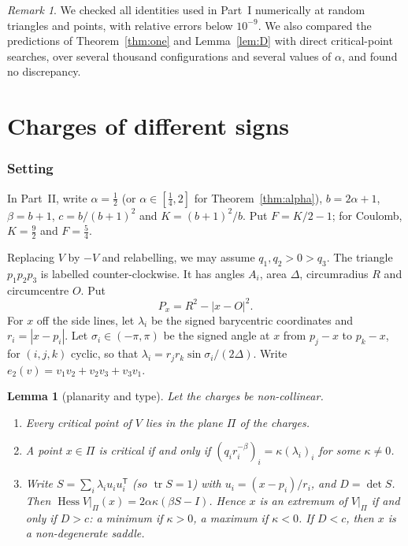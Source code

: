 \documentclass[11pt]{amsart}
\newtheorem{lemma}[theorem]{Lemma}
\theoremstyle{remark}
\newtheorem{remark}[theorem]{Remark}
\DeclareMathOperator{\Hess}{Hess}
\begin{document}
\begin{remark}
We checked all identities used in Part~I numerically at random triangles and points, with relative errors below
$10^{-9}$. We also compared the predictions of Theorem~\ref{thm:one} and Lemma~\ref{lem:D} with direct critical-point
searches, over several thousand configurations and several values of $\alpha$, and found no discrepancy.
\end{remark}

\part{Charges of different signs}

\section{Setting}\label{sec:setting}

In Part~II, write $\alpha=\tfrac12$ (or $\alpha\in[\tfrac14,2]$ for Theorem~\ref{thm:alpha}), $b=2\alpha+1$, $\beta=b+1$,
$c=b/(b+1)^2$ and $K=(b+1)^2/b$. Put $F=K/2-1$; for Coulomb, $K=\tfrac92$ and $F=\tfrac54$.

Replacing $V$ by $-V$ and relabelling, we may assume $q_1,q_2>0>q_3$. The triangle $p_1p_2p_3$ is labelled
counter-clockwise. It has angles $A_i$, area $\Delta$, circumradius $R$ and circumcentre $O$. Put
\[
  P_x=R^2-|x-O|^2 .
\]
For $x$ off the side lines, let $\lambda_i$ be the signed barycentric coordinates and $r_i=|x-p_i|$. Let
$\sigma_i\in(-\pi,\pi)$ be the signed angle at $x$ from $p_j-x$ to $p_k-x$, for $(i,j,k)$ cyclic, so that
$\lambda_i=r_jr_k\sin\sigma_i/(2\Delta)$. Write $e_2(v)=v_1v_2+v_2v_3+v_3v_1$.

\begin{lemma}[planarity and type]\label{lem:type}
Let the charges be non-collinear.
\begin{enumerate}
\item Every critical point of $V$ lies in the plane $\Pi$ of the charges.
\item A point $x\in\Pi$ is critical if and only if $(q_ir_i^{-\beta})_i=\kappa(\lambda_i)_i$ for some $\kappa\ne0$.
\item Write $S=\sum_i\lambda_iu_iu_i^{\mathsf T}$ (so $\operatorname{tr}S=1$) with $u_i=(x-p_i)/r_i$, and $D=\det S$. Then
  $\Hess V|_\Pi(x)=2\alpha\kappa(\beta S-I)$. Hence $x$ is an extremum of $V|_\Pi$ if and only if $D>c$: a minimum if
  $\kappa>0$, a maximum if $\kappa<0$. If $D<c$, then $x$ is a non-degenerate saddle.
\end{enumerate}
\end{lemma}
\end{document}
